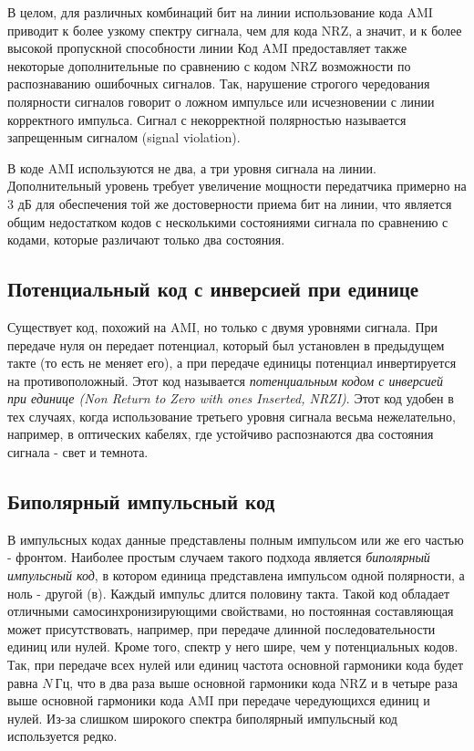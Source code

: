 В целом, для различных комбинаций бит на линии использование кода AMI приводит к более узкому спектру сигнала, чем для кода NRZ, а значит, и к более высокой пропускной способности линии
Код AMI предоставляет также некоторые дополнительные по сравнению с кодом NRZ возможности по распознаванию ошибочных сигналов.
Так, нарушение строгого чередования полярности сигналов говорит о ложном импульсе или исчезновении с линии корректного импульса.
Сигнал с некорректной полярностью называется запрещенным сигналом (signal violation).

В коде AMI используются не два, а три уровня сигнала на линии.
Дополнительный уровень требует увеличение мощности передатчика примерно на 3 дБ для обеспечения той же достоверности приема бит на линии, что является общим недостатком кодов с несколькими состояниями сигнала по сравнению с кодами, которые различают только два состояния.

\subsection{Потенциальный код с инверсией при единице}

Существует код, похожий на AMI, но только с двумя уровнями сигнала.
При передаче нуля он передает потенциал, который был установлен в предыдущем такте (то есть не меняет его), а при передаче единицы потенциал инвертируется на противоположный.
Этот код называется \emph{потенциальным кодом с инверсией при единице (Non Return to Zero with ones Inserted, NRZI)}.
Этот код удобен в тех случаях, когда использование третьего уровня сигнала весьма нежелательно, например, в оптических кабелях, где устойчиво распознаются два состояния сигнала - свет и темнота.

\subsection{Биполярный импульсный код}

В импульсных кодах данные представлены полным импульсом или же его частью - фронтом.
Наиболее простым случаем такого подхода является \emph{биполярный импульсный код}, в котором единица представлена импульсом одной полярности, а ноль - другой (в).
Каждый импульс длится половину такта.
Такой код обладает отличными самосинхронизирующими свойствами, но постоянная составляющая может присутствовать, например, при передаче длинной последовательности единиц или нулей.
Кроме того, спектр у него шире, чем у потенциальных кодов.
Так, при передаче всех нулей или единиц частота основной гармоники кода будет равна $N~Гц$, что в два раза выше основной гармоники кода NRZ и в четыре раза выше основной гармоники кода AMI при передаче чередующихся единиц и нулей.
Из-за слишком широкого спектра биполярный импульсный код используется редко.

